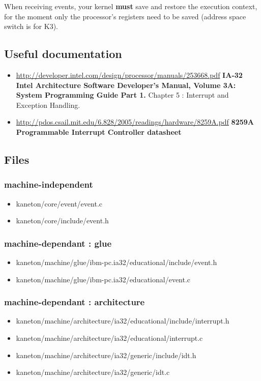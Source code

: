 When receiving events, your kernel \textbf{must} save and restore
the execution context, for the moment only the processor's
registers need to be saved (address space switch is for K3).

\subsection*{Useful documentation}

\begin{itemize}
  \item \url{http://developer.intel.com/design/processor/manuals/253668.pdf}
	    {\textbf{IA-32 Intel Architecture Software Developer's Manual,
	    Volume 3A: System Programming Guide Part 1.}}
	    Chapter 5 : Interrupt and Exception Handling.
  \item \url{http://pdos.csail.mit.edu/6.828/2005/readings/hardware/8259A.pdf}
	    {\textbf{8259A Programmable Interrupt Controller datasheet}}
\end{itemize}

\subsection*{Files}

\subsubsection{\color{filerefcolor} machine-independent}
\begin{itemize}
\item kaneton/core/event/event.c
\item kaneton/core/include/event.h
\end{itemize}

\subsubsection{\color{filerefcolor} machine-dependant : glue}
\begin{itemize}
\item kaneton/machine/glue/ibm-pc.ia32/educational/include/event.h
\item kaneton/machine/glue/ibm-pc.ia32/educational/event.c
\end{itemize}

\subsubsection{\color{filerefcolor} machine-dependant : architecture}
\begin{itemize}
\item kaneton/machine/architecture/ia32/educational/include/interrupt.h
\item kaneton/machine/architecture/ia32/educational/interrupt.c
\item kaneton/machine/architecture/ia32/generic/include/idt.h
\item kaneton/machine/architecture/ia32/generic/idt.c
\end{itemize}

